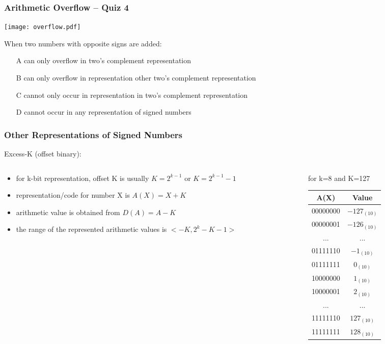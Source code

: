 \documentclass{beamer}
\begin{document}
\begin{frame}
\frametitle{Arithmetic Overflow -- Quiz 4}

\begin{center}
\texttt{[image: overflow.pdf]}
\end{center}

When two numbers with opposite signs are added:
\begin{itemize}
\item[A] can only overflow in two's complement representation
\item[B] can only overflow in representation other two's complement representation
\item[C] cannot only occur in representation in two's complement representation
\item[D] cannot occur in any representation of signed numbers
\end{itemize}
\end{frame}



\begin{frame}
\frametitle{Other Representations of Signed Numbers}

Excess-K (offset binary):

\begin{columns}
\begin{column}{0.5\textwidth}
\begin{itemize}
\item for k-bit representation, offset K is usually $K=2^{k-1}$ or $K=2^{k-1}-1$
\item representation/code for number X is $A(X) = X+K$
\item arithmetic value is obtained from $D(A) = A-K$
\item the range of the represented arithmetic values is $<-K, 2^{k}-K-1>$
\end{itemize}
\end{column}
\hfill
\begin{column}{0.5\textwidth}
for k=8 and K=127
\bigskip
\begin{tabular}{|c|c|}\hline
{\small A(X)}  & {\small Value} \\\hline
00000000 & $-127_{(10)}$ \\ \hline
00000001 & $-126_{(10)}$ \\ \hline
... & ... \\\hline
01111110 & $-1_{(10)}$ \\ \hline
01111111 & $0_{(10)}$ \\ \hline
10000000 & $1_{(10)}$ \\ \hline
10000001 & $2_{(10)}$ \\ \hline
... & ... \\\hline
11111110 & $127_{(10)}$ \\ \hline
11111111 & $128_{(10)}$ \\ \hline
\end{tabular}
\end{column}
\end{columns}

\end{frame}
\end{document}
